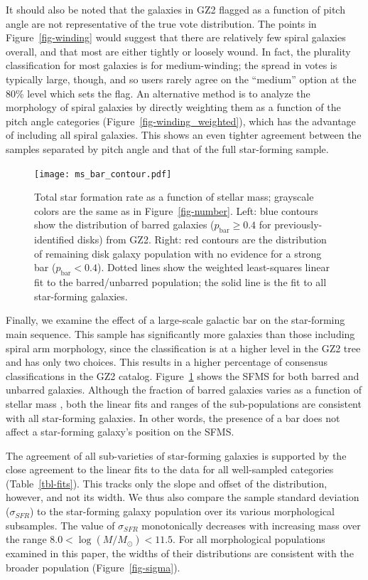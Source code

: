 \documentclass[useAMS,usenatbib]{mn2e}
\begin{document}
It should also be noted that the galaxies in GZ2 flagged as a function of pitch angle are not representative of the true vote distribution. The points in Figure~\ref{fig-winding} would suggest that there are relatively few spiral galaxies overall, and that most are either tightly or loosely wound. In fact, the plurality classification for most galaxies is for medium-winding; the spread in votes is typically large, though, and so users rarely agree on the ``medium'' option at the 80\% level which sets the flag. An alternative method is to analyze the morphology of spiral galaxies by directly weighting them as a function of the pitch angle categories (Figure~\ref{fig-winding_weighted}), which has the advantage of including all spiral galaxies. This shows an even tighter agreement between the samples separated by pitch angle and that of the full star-forming sample.

\begin{figure}
\texttt{[image: ms\_bar\_contour.pdf]}
\caption{Total star formation rate as a function of stellar mass; grayscale colors are the same as in Figure~\ref{fig-number}. Left: blue contours show the distribution of barred galaxies ($p_\textrm{bar}\ge0.4$ for previously-identified disks) from GZ2. Right: red contours are the distribution of remaining disk galaxy population with no evidence for a strong bar ($p_\textrm{bar}<0.4$). Dotted lines show the weighted least-squares linear fit to the barred/unbarred population; the solid line is the fit to all star-forming galaxies. 
\label{fig-bar}}
\end{figure}

Finally, we examine the effect of a large-scale galactic bar on the star-forming main sequence. This sample has significantly more galaxies than those including spiral arm morphology, since the classification is at a higher level in the GZ2 tree and has only two choices. This results in a higher percentage of consensus classifications in the GZ2 catalog. Figure~\ref{fig-bar} shows the SFMS for both barred and unbarred galaxies. Although the fraction of barred galaxies varies as a function of stellar mass \citep{she08a,cam10,mas11c,che13}, both the linear fits and ranges of the sub-populations are consistent with all star-forming galaxies. In other words, the presence of a bar does not affect a star-forming galaxy's position on the SFMS. 

The agreement of all sub-varieties of star-forming galaxies is supported by the close agreement to the linear fits to the data for all well-sampled categories (Table~\ref{tbl-fits}). This tracks only the slope and offset of the distribution, however, and not its width. We thus also compare the sample standard deviation ($\sigma_{SFR}$) to the star-forming galaxy population over its various morphological subsamples. The value of $\sigma_{SFR}$ monotonically decreases with increasing mass over the range $8.0<\log(M/M_\odot)<11.5$. For all morphological populations examined in this paper, the widths of their distributions are consistent with the broader population (Figure~\ref{fig-sigma}). 
\end{document}
